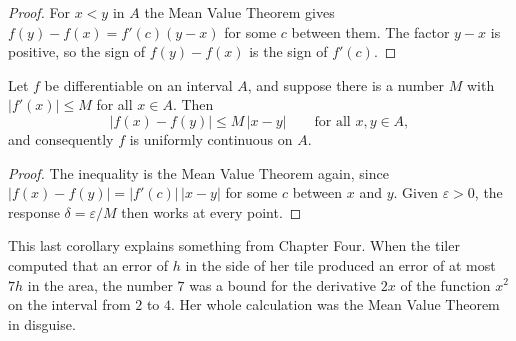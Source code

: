 \begin{proof}
For $x < y$ in $A$ the Mean Value Theorem gives $f(y) - f(x) = f'(c)(y - x)$ for some $c$ between them.  The factor $y - x$ is positive, so the sign of $f(y) - f(x)$ is the sign of $f'(c)$.
\end{proof}

\begin{corollary}\label{cor:bounded-derivative}
Let $f$ be differentiable on an interval $A$, and suppose there is a number $M$ with $|f'(x)| \leq M$ for all $x \in A$.  Then
\[ |f(x) - f(y)| \leq M\,|x - y| \qquad \text{for all } x, y \in A, \]
and consequently $f$ is uniformly continuous on $A$.
\end{corollary}

\begin{proof}
The inequality is the Mean Value Theorem again, since $|f(x) - f(y)| = |f'(c)|\,|x - y|$ for some $c$ between $x$ and $y$.  Given $\varepsilon > 0$, the response $\delta = \varepsilon/M$ then works at every point.
\end{proof}

\begin{marginfigure}
\centering
{}
\caption{A bound on the derivative confines the graph.  Seen from any point on it, the rest of the graph must stay inside the shaded cone, between the lines of slope $M$ and $-M$.}
\end{marginfigure}

This last corollary explains something from Chapter Four.  When the tiler computed that an error of $h$ in the side of her tile produced an error of at most $7h$ in the area, the number $7$ was a bound for the derivative $2x$ of the function $x^2$ on the interval from $2$ to $4$.  Her whole calculation was the Mean Value Theorem in disguise.

